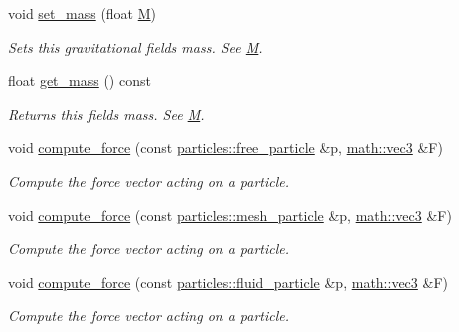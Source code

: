 \begin{DoxyCompactItemize}
\mbox{\label{classphysim_1_1fields_1_1gravitational_a818cfac517c4d0469d9c0c9e54416685}} 
void \hyperlink{classphysim_1_1fields_1_1gravitational_a818cfac517c4d0469d9c0c9e54416685}{set\+\_\+mass} (float \hyperlink{classphysim_1_1fields_1_1gravitational_a0094aa217397b429bd807d6c630ec331}{M})
\begin{DoxyCompactList}\small\item\em Sets this gravitational field\textquotesingle{}s mass. See \hyperlink{classphysim_1_1fields_1_1gravitational_a0094aa217397b429bd807d6c630ec331}{M}. \end{DoxyCompactList}\item 
\mbox{\label{classphysim_1_1fields_1_1gravitational_ae9b997278957311183a828800bdcbc6f}} 
float \hyperlink{classphysim_1_1fields_1_1gravitational_ae9b997278957311183a828800bdcbc6f}{get\+\_\+mass} () const
\begin{DoxyCompactList}\small\item\em Returns this field\textquotesingle{}s mass. See \hyperlink{classphysim_1_1fields_1_1gravitational_a0094aa217397b429bd807d6c630ec331}{M}. \end{DoxyCompactList}\item 
void \hyperlink{classphysim_1_1fields_1_1gravitational_af852abc69f07c67eb888fac9e7637693}{compute\+\_\+force} (const \hyperlink{classphysim_1_1particles_1_1free__particle}{particles\+::free\+\_\+particle} \&p, \hyperlink{structphysim_1_1math_1_1vec3}{math\+::vec3} \&F)
\begin{DoxyCompactList}\small\item\em Compute the force vector acting on a particle. \end{DoxyCompactList}\item 
void \hyperlink{classphysim_1_1fields_1_1gravitational_a2283f98ad0ce6732c81e744d3c2b898d}{compute\+\_\+force} (const \hyperlink{classphysim_1_1particles_1_1mesh__particle}{particles\+::mesh\+\_\+particle} \&p, \hyperlink{structphysim_1_1math_1_1vec3}{math\+::vec3} \&F)
\begin{DoxyCompactList}\small\item\em Compute the force vector acting on a particle. \end{DoxyCompactList}\item 
void \hyperlink{classphysim_1_1fields_1_1gravitational_a1b11432dfb9e1bc2720794304f224432}{compute\+\_\+force} (const \hyperlink{classphysim_1_1particles_1_1fluid__particle}{particles\+::fluid\+\_\+particle} \&p, \hyperlink{structphysim_1_1math_1_1vec3}{math\+::vec3} \&F)
\begin{DoxyCompactList}\small\item\em Compute the force vector acting on a particle. \end{DoxyCompactList}\end{DoxyCompactItemize}
